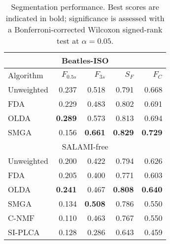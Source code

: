 \begin{table}
\centering
\caption{Segmentation performance. Best scores are indicated in bold; significance is assessed with a Bonferroni-corrected Wilcoxon
signed-rank test at $\alpha=0.05$.\label{tab:results}}
\begin{tabular}{lrrrr}
\multicolumn{5}{c}{Beatles-ISO}\\
\toprule%
Algorithm   & $F_{0.5s}$ & $F_{3s}$   & $S_F$ & $F_C$\\
\hline
Unweighted  & 0.237             & 0.518             & 0.791             & 0.668\\
FDA         & 0.229             & 0.483             & 0.802             & 0.691\\
OLDA        & \textbf{0.289}    & 0.573             & 0.813             & 0.694\\
\hline
SMGA~\hfill\cite{serra2012unsupervised} 
            & 0.156             & \textbf{0.661}    & \textbf{0.829}    & \textbf{0.729}\\
\toprule%
\multicolumn{5}{c}{SALAMI-free}\\
\toprule%
Unweighted  & 0.200             & 0.422             & 0.794             & 0.626\\
FDA         & 0.205             & 0.400             & 0.771             & 0.603\\
OLDA        & \textbf{0.241}    & 0.467             & \textbf{0.808}    & \textbf{0.640}\\
\hline
SMGA~\hfill\cite{serra2012unsupervised} 
            & 0.134             & \textbf{0.508}    & 0.786             & 0.550\\
C-NMF~\hfill\cite{nieto2013convex}  
            & 0.110             & 0.463             & 0.767             & 0.550\\
SI-PLCA~\hfill\cite{weiss2011unsupervised}  
            & 0.128             & 0.286             & 0.643             & 0.459\\
\bottomrule%
\end{tabular}
\end{table}
